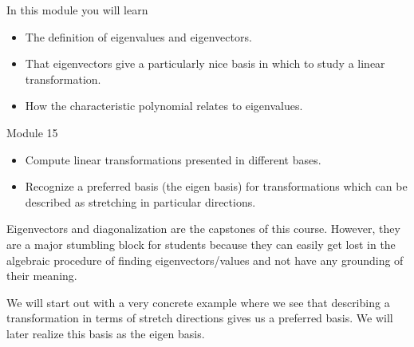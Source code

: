 \documentclass{workbook}
\begin{document}
\begin{module}

	In this module you will learn
	\begin{itemize}
		\item The definition of eigenvalues and eigenvectors.
		\item That eigenvectors give a particularly nice basis in which to study a linear transformation.
		\item How the characteristic polynomial relates to eigenvalues.
	\end{itemize}

	
	
	
\end{module}
\begin{lesson}

	Module 15

	\begin{itemize}
		\item Compute linear transformations presented in different bases.
		\item Recognize a preferred basis (the eigen basis) for transformations
			which can be described as stretching in particular directions.
	\end{itemize}

	Eigenvectors and diagonalization are the capstones of this course. However,
	they are a major stumbling block for students because they can easily get lost in
	the algebraic procedure of finding eigenvectors/values and not have any grounding
	of their meaning.

	We will start out with a very concrete example where we see that
	describing a transformation in terms of stretch directions gives us a preferred basis.
	We will later realize this basis as the eigen basis.

\end{lesson}
\end{document}
